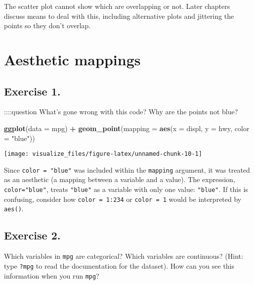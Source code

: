 \documentclass[]{book}
\newenvironment{Shaded}{\begin{snugshade}}{\end{snugshade}}
\newcommand{\DataTypeTok}[1]{\textcolor[rgb]{0.13,0.29,0.53}{#1}}
\newcommand{\KeywordTok}[1]{\textcolor[rgb]{0.13,0.29,0.53}{\textbf{#1}}}
\newcommand{\NormalTok}[1]{#1}
\newcommand{\OperatorTok}[1]{\textcolor[rgb]{0.81,0.36,0.00}{\textbf{#1}}}
\newcommand{\StringTok}[1]{\textcolor[rgb]{0.31,0.60,0.02}{#1}}
\theoremstyle{definition}
\theoremstyle{definition}
\theoremstyle{definition}
\theoremstyle{remark}
\begin{document}
The scatter plot cannot show which are overlapping or not. Later
chapters discuss means to deal with this, including alternative plots
and jittering the points so they don't overlap.

\hypertarget{aesthetic-mappings}{%
\section{Aesthetic mappings}\label{aesthetic-mappings}}

\hypertarget{exercise-1.-1}{%
\subsection{Exercise 1.}\label{exercise-1.-1}}

::::question What's gone wrong with this code? Why are the points not
blue?

\begin{Shaded}
\begin{Highlighting}[]
\KeywordTok{ggplot}\NormalTok{(}\DataTypeTok{data =}\NormalTok{ mpg) }\OperatorTok{+}\StringTok{ }
\StringTok{  }\KeywordTok{geom_point}\NormalTok{(}\DataTypeTok{mapping =} \KeywordTok{aes}\NormalTok{(}\DataTypeTok{x =}\NormalTok{ displ, }\DataTypeTok{y =}\NormalTok{ hwy, }\DataTypeTok{color =} \StringTok{"blue"}\NormalTok{))}
\end{Highlighting}
\end{Shaded}

\begin{center}\texttt{[image: visualize\_files/figure-latex/unnamed-chunk-10-1]} \end{center}

Since \texttt{color\ =\ "blue"} was included within the \texttt{mapping}
argument, it was treated as an aesthetic (a mapping between a variable
and a value). The expression, \texttt{color="blue"}, treats
\texttt{"blue"} as a variable with only one value: \texttt{"blue"}. If
this is confusing, consider how \texttt{color\ =\ 1:234} or
\texttt{color\ =\ 1} would be interpreted by \texttt{aes()}.

\hypertarget{exercise-2.-1}{%
\subsection{Exercise 2.}\label{exercise-2.-1}}

Which variables in \texttt{mpg} are categorical? Which variables are
continuous? (Hint: type \texttt{?mpg} to read the documentation for the
dataset). How can you see this information when you run \texttt{mpg}?
\end{document}
